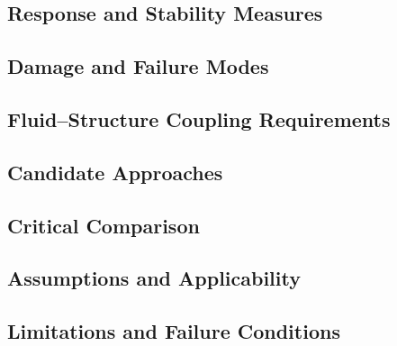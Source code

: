 
\subsection{Response and Stability Measures}
\label{sec:res-str-lod-response-stability-measures}


\subsection{Damage and Failure Modes}
\label{sec:res-str-lod-damage-failure-modes}


\subsection{Fluid--Structure Coupling Requirements}
\label{sec:res-str-lod-fluid-structure-coupling-requirements}


\subsection{Candidate Approaches}
\label{sec:res-str-lod-candidate-approaches}


\subsection{Critical Comparison}
\label{sec:res-str-lod-critical-comparison}


\subsection{Assumptions and Applicability}
\label{sec:res-str-lod-assumptions}


\subsection{Limitations and Failure Conditions}
\label{sec:res-str-lod-limitations}

